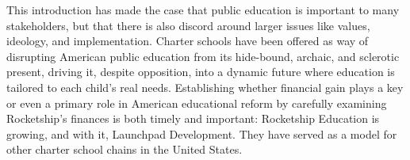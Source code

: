 This introduction has made the case that public education is important to many stakeholders, but that there is also discord around larger issues like values, ideology, and implementation. Charter schools have been offered as way of disrupting American public education from its hide-bound, archaic, and sclerotic present, driving it, despite opposition, into a dynamic future where education is tailored to each child's real needs. Establishing whether financial gain plays a key or even a primary role in American educational reform by carefully examining Rocketship's finances is both timely and important: Rocketship Education is growing, and with it, Launchpad Development. They have served as a model for other charter school chains in the United States.

